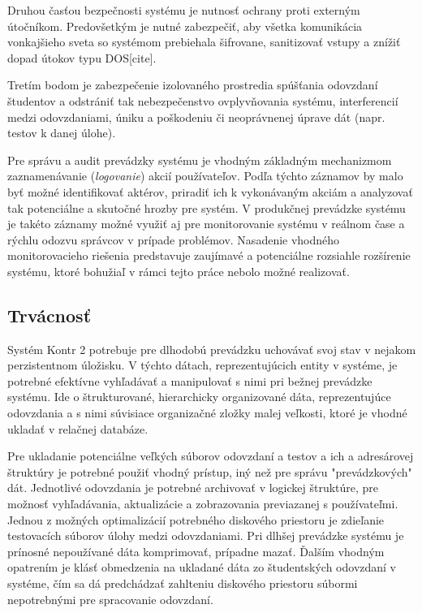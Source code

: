 \documentclass[
  digital, %
  twoside, %
  table,   %
  lof,     %
  lot,     %
]{fithesis3}
\begin{document}
Druhou časťou bezpečnosti systému je nutnosť ochrany proti externým útočníkom. Predovšetkým je nutné zabezpečiť, aby všetka komunikácia vonkajšieho sveta so systémom prebiehala šifrovane, sanitizovať vstupy a znížiť dopad útokov typu DOS[cite]. 

Tretím bodom je zabezpečenie izolovaného prostredia spúšťania odovzdaní študentov a odstrániť tak nebezpečenstvo ovplyvňovania systému, interferencií medzi odovzdaniami, úniku a poškodeniu či neoprávnenej úprave dát (napr. testov k danej úlohe).

Pre správu a audit prevádzky systému je vhodným základným mechanizmom zaznamenávanie (\emph{logovanie}) akcií používateľov. Podľa týchto záznamov by malo byť možné identifikovať aktérov, priradiť ich k vykonávaným akciám a analyzovať tak potenciálne a skutočné hrozby pre systém. V produkčnej prevádzke systému je takéto záznamy možné využiť aj pre monitorovanie systému v reálnom čase a rýchlu odozvu správcov v prípade problémov. Nasadenie vhodného monitorovacieho riešenia predstavuje zaujímavé a potenciálne rozsiahle rozšírenie systému, ktoré bohužiaľ v rámci tejto práce nebolo možné realizovať.

\subsection{Trvácnosť}
Systém Kontr 2 potrebuje pre dlhodobú prevádzku uchovávať svoj stav v nejakom perzistentnom úložisku. V týchto dátach, reprezentujúcich entity v systéme, je potrebné efektívne vyhľadávať a manipulovať s nimi pri bežnej prevádzke systému. Ide o štrukturované, hierarchicky organizované dáta, reprezentujúce odovzdania a s nimi súvisiace organizačné zložky malej veľkosti, ktoré je vhodné ukladať v relačnej databáze. 

Pre ukladanie potenciálne veľkých súborov odovzdaní a testov a ich a adresárovej štruktúry je potrebné použiť vhodný prístup, iný než pre správu "prevádzkových" dát. Jednotlivé odovzdania je potrebné archivovať v logickej štruktúre, pre možnosť vyhľadávania, aktualizácie a zobrazovania previazanej s používateľmi. Jednou z možných optimalizácií potrebného diskového priestoru je zdieľanie testovacích súborov úlohy medzi odovzdaniami. Pri dlhšej prevádzke systému je prínosné nepoužívané dáta komprimovať, prípadne mazať. Ďalším vhodným opatrením je klásť obmedzenia na ukladané dáta zo študentských odovzdaní v systéme, čím sa dá predchádzať zahlteniu diskového priestoru súbormi nepotrebnými pre spracovanie odovzdaní.
\end{document}
